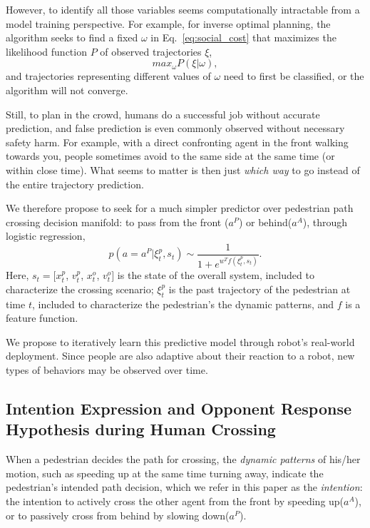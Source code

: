\documentclass[conference]{IEEEtran}
\begin{document}
However, to identify all those variables seems computationally intractable 
from a model training perspective. For example, for inverse optimal planning, 
the algorithm seeks to find a fixed $\omega$ in 
Eq.~\ref{eq:social_cost} that maximizes the likelihood function $P$ of 
observed trajectories $\xi$,
\begin{equation}
  max_{\omega} P(\xi|\omega),
\end{equation}
and trajectories representing different values of $\omega$ need to first be 
classified, or the algorithm will not converge. 

Still, to plan in the crowd, humans do a successful job without accurate 
prediction, and false prediction is even commonly observed without necessary 
safety harm. For example, with a direct confronting agent in the front walking 
towards you, people sometimes avoid to the same side at the same time (or 
within close time). What seems to matter is then just \textit{which way} 
to go instead of the entire trajectory prediction. 

We therefore propose to seek for a much simpler predictor over pedestrian path 
crossing decision manifold: to pass from the front ($a^P$) or behind($a^A$), 
through logistic regression,
\begin{equation}
p(a=a^P|\xi^p_t, s_t) \sim \frac{1}{1+e^{w^Tf(\xi^p_t, s_t)}}.
\end{equation}
Here, $s_t = [x^p_t$, $v^p_t$, $x^o_t$, $v^o_t]$ is the state of the overall 
system, included to characterize the crossing scenario;  $\xi^p_t$ is the past 
trajectory of the pedestrian at time $t$, included to characterize the 
pedestrian's the dynamic patterns, and $f$ is a feature function.


We propose to iteratively learn this predictive model through robot's real-world 
deployment. Since people are also adaptive about their reaction to a robot, 
new types of behaviors may be observed over time.

\vspace{-.3em}
\subsection{Intention Expression and Opponent Response Hypothesis during Human Crossing}
When a pedestrian decides the path for crossing, the \textit{dynamic patterns} of his/her
motion, such as speeding up at the same time turning away, indicate the pedestrian's
intended path decision, which we refer in this paper as the \textit{intention}: the 
intention to actively cross the other agent from the front by speeding up($a^A$), 
or to passively cross from behind by slowing down($a^P$).
\end{document}
